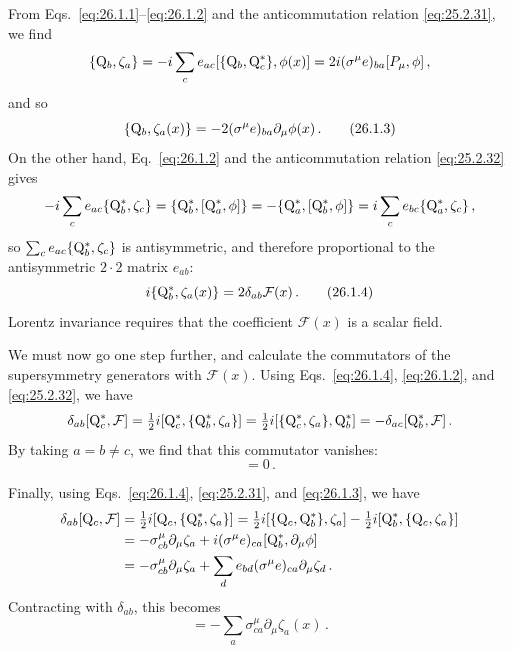 From Eqs.~\eqref{eq:26.1.1}--\eqref{eq:26.1.2} and the anticommutation
relation \eqref{eq:25.2.31}, we find
\[
  \{\mathrm{Q}_b,\zeta_a\}
  =-i\sum_c e_{ac}[\{\mathrm{Q}_b,\mathrm{Q}_c^*\},\phi(x)]
  =2i(\sigma^\mu e)_{ba}[P_\mu,\phi]\,,
\]
and so
\begin{equation}
  \{\mathrm{Q}_b,\zeta_a(x)\}
  =-2(\sigma^\mu e)_{ba}\partial_\mu\phi(x)\,.
  \tag{26.1.3}\label{eq:26.1.3}
\end{equation}
On the other hand, Eq.~\eqref{eq:26.1.2} and the anticommutation relation
\eqref{eq:25.2.32} gives
\[
  -i\sum_c e_{ac}\{\mathrm{Q}_b^*,\zeta_c\}
  =\{\mathrm{Q}_b^*,[\mathrm{Q}_a^*,\phi]\}
  =-\{\mathrm{Q}_a^*,[\mathrm{Q}_b^*,\phi]\}
  =i\sum_c e_{bc}\{\mathrm{Q}_a^*,\zeta_c\}\,,
\]
so \(\sum_c e_{ac}\{\mathrm{Q}_b^*,\zeta_c\}\) is antisymmetric, and therefore
proportional to the antisymmetric \(2\cdot2\) matrix \(e_{ab}\):
\begin{equation}
  i\{\mathrm{Q}_b^*,\zeta_a(x)\}=2\delta_{ab}\mathcal{F}(x)\,.
  \tag{26.1.4}\label{eq:26.1.4}
\end{equation}
Lorentz invariance requires that the coefficient \(\mathcal{F}(x)\) is a
scalar field.

We must now go one step further, and calculate the commutators of the
supersymmetry generators with \(\mathcal{F}(x)\). Using
Eqs.~\eqref{eq:26.1.4}, \eqref{eq:26.1.2}, and \eqref{eq:25.2.32}, we have
\[
  \delta_{ab}[\mathrm{Q}_c^*,\mathcal{F}]
  =\tfrac12 i[\mathrm{Q}_c^*,\{\mathrm{Q}_b^*,\zeta_a\}]
  =\tfrac12 i[\{\mathrm{Q}_c^*,\zeta_a\},\mathrm{Q}_b^*]
  =-\delta_{ac}[\mathrm{Q}_b^*,\mathcal{F}]\,.
\]
By taking \(a=b\ne c\), we find that this commutator vanishes:
\begin{equation}
  [\WeylQ_c^*,\mathcal{F}(x)]=0\,.
  \tag{26.1.5}\label{eq:26.1.5}
\end{equation}

Finally, using Eqs.~\eqref{eq:26.1.4}, \eqref{eq:25.2.31}, and
\eqref{eq:26.1.3}, we have
\[
  \begin{aligned}
  \delta_{ab}[\mathrm{Q}_c,\mathcal{F}]
  &=\tfrac12 i[\mathrm{Q}_c,\{\mathrm{Q}_b^*,\zeta_a\}]
    =\tfrac12 i[\{\mathrm{Q}_c,\mathrm{Q}_b^*\},\zeta_a]
      -\tfrac12 i[\mathrm{Q}_b^*,\{\mathrm{Q}_c,\zeta_a\}]
  \\
  &=-\sigma^\mu_{cb}\partial_\mu\zeta_a
    +i(\sigma^\mu e)_{ca}[\mathrm{Q}_b^*,\partial_\mu\phi]
  \\
  &=-\sigma^\mu_{cb}\partial_\mu\zeta_a
    +\sum_d e_{bd}(\sigma^\mu e)_{ca}\partial_\mu\zeta_d\,.
  \end{aligned}
\]
Contracting with \(\delta_{ab}\), this becomes
\begin{equation}
  [\WeylQ_c,\mathcal{F}(x)]
  =-\sum_a\sigma^\mu_{ca}\partial_\mu\zeta_a(x)\,.
  \tag{26.1.6}\label{eq:26.1.6}
\end{equation}

